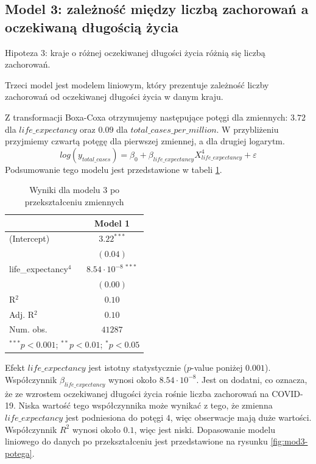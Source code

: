 \documentclass[12pt]{mwbk}
\theoremstyle{plain}
\theoremstyle{definition}
\theoremstyle{remark}
\begin{document}
\subsection{Model 3: zależność między liczbą zachorowań a oczekiwaną długością życia}


Hipoteza 3: kraje o różnej oczekiwanej długości życia różnią się liczbą zachorowań.

Trzeci model jest modelem liniowym, który prezentuje zależność liczby zachorowań od oczekiwanej długości życia w danym kraju.

Z transformacji Boxa-Coxa otrzymujemy następujące potęgi dla zmiennych: $3.72$ dla $life\_expectancy$ oraz $0.09$ dla $total\_cases\_per\_million$. W przybliżeniu przyjmiemy czwartą potęgę dla pierwszej zmiennej, a dla drugiej logarytm.
$$log(y_{total\_cases})=\beta_0+\beta_{life\_expectancy}X_{life\_expectancy}^4+\varepsilon$$
Podsumowanie tego modelu jest przedstawione w tabeli \ref{table:mod3-potega}.


\begin{table}[!htbp]
	\begin{center}
		\begin{tabular}{l c}
		\hline
		& Model 1 \\
		\hline
		(Intercept)          & $3.22^{***}$ \\
		& $(0.04)$     \\
		life\_expectancy$^4$ & $8.54\cdot10^{-8~  ***}$ \\
		& $(0.00)$     \\
		\hline
		R$^2$                & $0.10$       \\
		Adj. R$^2$           & $0.10$       \\
		Num. obs.            & $41287$      \\
		\hline
		\multicolumn{2}{l}{\scriptsize{$^{***}p<0.001$; $^{**}p<0.01$; $^{*}p<0.05$}}
	\end{tabular}
		\caption{Wyniki dla modelu 3 po przekształceniu zmiennych}
		\label{table:mod3-potega}
	\end{center}
\end{table}

Efekt $life\_expectancy$ jest istotny statystycznie ($p$-value poniżej $0.001$). Współczynnik $\beta_{life\_expectancy}$ wynosi około $8.54 \cdot 10^{-8}$. Jest on dodatni, co oznacza, że ze wzrostem oczekiwanej długości życia rośnie liczba zachorowań na COVID-19. Niska wartość tego współczynnika może wynikać z tego, że zmienna $life\_expectancy$ jest podniesiona do potęgi $4$, więc obserwacje mają duże wartości. Współczynnik $R^2$ wynosi około $0.1$, więc jest niski. Dopasowanie modelu liniowego do danych po przekształceniu jest przedstawione na rysunku \ref{fig:mod3-potega}.
\end{document}
